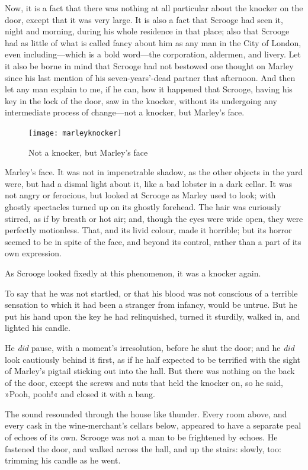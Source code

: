 Now, it is a fact that there was nothing at all particular about the knocker on the door, except that it was very large. It is also a fact that Scrooge had seen it, night and morning, during his whole residence in that place; also that Scrooge had as little of what is called fancy about him as any man in the City of London, even including—which is a bold word—the corporation, aldermen, and livery. Let it also be borne in mind that Scrooge had not bestowed one thought on Marley since his last mention of his seven-years'-dead partner that afternoon. And then let any man explain to me, if he can, how it happened that Scrooge, having his key in the lock of the door, saw in the knocker, without its undergoing any intermediate process of change—not a knocker, but Marley's face.

\begin{figure}[t]
\centering
\texttt{[image: marleyknocker]}
\caption{Not a knocker, but Marley's face}
\end{figure}

Marley's face. It was not in impenetrable shadow, as the other objects in the yard were, but had a dismal light about it, like a bad lobster in a dark cellar. It was not angry or ferocious, but looked at Scrooge as Marley used to look; with ghostly spectacles turned up on its ghostly forehead. The hair was curiously stirred, as if by breath or hot air; and, though the eyes were wide open, they were perfectly motionless. That, and its livid colour, made it horrible; but its horror seemed to be in spite of the face, and beyond its control, rather than a part of its own expression.

As Scrooge looked fixedly at this phenomenon, it was a knocker again.

To say that he was not startled, or that his blood was not conscious of a terrible sensation to which it had been a stranger from infancy, would be untrue. But he put his hand upon the key he had relinquished, turned it sturdily, walked in, and lighted his can\-dle.

He \textit{did} pause, with a moment's irresolution, before he shut the door; and he \textit{did} look cautiously behind it first, as if he half expected to be terrified with the sight of Marley's pigtail sticking out into the hall. But there was nothing on the back of the door, except the screws and nuts that held the knocker on, so he said, »Pooh, pooh!« and closed it with a bang.

The sound resounded through the house like thunder. Every room above, and every cask in the wine-merchant's cellars below, appeared to have a separate peal of echoes of its own. Scrooge was not a man to be frightened by echoes. He fastened the door, and walked across the hall, and up the stairs: slowly, too: trimming his candle as he went.

